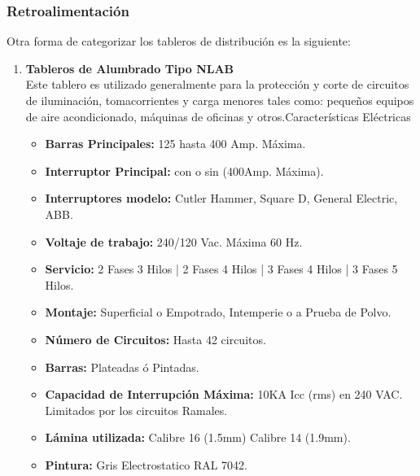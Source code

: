 \documentclass[11pt,letterpaper]{article}
\begin{document}
\subsubsection{Retroalimentación}
Otra forma de categorizar los tableros de distribución es la siguiente:
\begin{enumerate}
	\item 	\textbf{Tableros de Alumbrado Tipo NLAB}\\
		Este tablero es utilizado generalmente para la protección y corte de circuitos de iluminación, tomacorrientes y carga menores tales como: pequeños equipos de aire acondicionado, máquinas de oficinas y otros.Características Eléctricas
		\begin{itemize}
			\item \textbf{Barras Principales:} 125 hasta 400 Amp. Máxima.
			\item \textbf{Interruptor Principal:} con o sin (400Amp. Máxima).
			\item \textbf{Interruptores modelo:} Cutler Hammer, Square D, General Electric, ABB.
			\item \textbf{Voltaje de trabajo:} 240/120 Vac. Máxima 60 Hz.
			\item \textbf{Servicio:} 2 Fases 3 Hilos | 2 Fases 4 Hilos | 3 Fases 4 Hilos | 3 Fases 5 Hilos.
			\item \textbf{Montaje:} Superficial o Empotrado, Intemperie o a Prueba de Polvo.
			\item \textbf{Número de Circuitos:} Hasta 42 circuitos.
			\item \textbf{Barras:} Plateadas ó Pintadas.
			\item \textbf{Capacidad de Interrupción Máxima:} 10KA Icc (rms) en 240 VAC. Limitados por los circuitos Ramales.
			\item \textbf{Lámina utilizada:} Calibre 16 (1.5mm) Calibre 14 (1.9mm).
			\item \textbf{Pintura:}	Gris Electrostatico RAL 7042.
		\end{itemize}
	

\end{enumerate}
\end{document}
